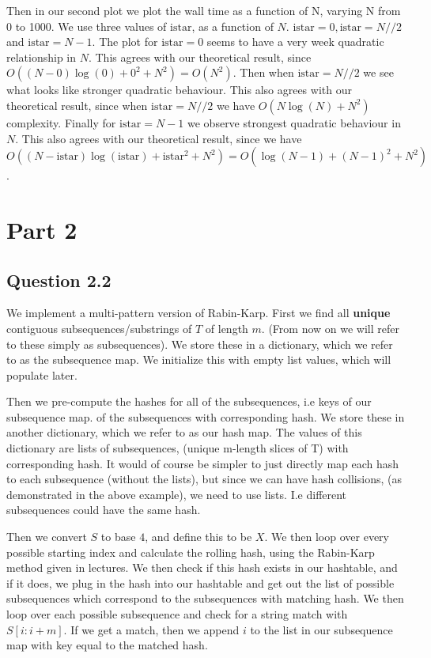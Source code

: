 \documentclass[a4paper, oneside]{book}
\begin{document}
Then in our second plot we plot the wall time as a function of N, varying N from 0 to 1000.
We use three values of $\text{istar}$, as a function of $N$. $\text{istar} = 0, \text{istar} = N // 2$ and $\text{istar} = N - 1$.
The plot for $\text{istar}=0$ seems to have a very week quadratic relationship in $N$.
This agrees with our theoretical result, since $O((N - 0)\log(0) + 0^2 + N^2) = O(N^2).$
Then when $\text{istar} = N // 2$ we see what looks like stronger quadratic behaviour.
This also agrees with our theoretical result, since when $\text{istar} = N//2$ we have $O(N\log(N) + N^2)$ complexity.
Finally for $\text{istar} = N -1$ we observe strongest quadratic behaviour in $N$. This also agrees with our theoretical
result, since we have $O((N - \text{istar})\log(\text{istar}) + \text{istar}^2 + N^2) = O(\log(N - 1) + (N - 1)^2 + N^2)$.

\section*{Part 2}

\subsection*{Question 2.2}
We implement a multi-pattern version of Rabin-Karp.
First we find all \textbf{unique} contiguous subsequences/substrings of $T$ of length $m$.
(From now on we will refer to these simply as subsequences).
We store these in a dictionary, which we refer to as the subsequence map.
We initialize this with empty list values, which will populate later.

Then we pre-compute the hashes for all of the subsequences, i.e keys of our subsequence map.
of the subsequences with corresponding hash. We store these in another dictionary, which we refer
to as our hash map. The values of this dictionary are lists of subsequences, (unique m-length slices of T)
with corresponding hash.
It would of course be simpler to just directly map each hash to each subsequence (without the lists),
but since we can have hash collisions, (as demonstrated in the above example), we need
to use lists. I.e different subsequences could have the same hash.

Then we convert $S$ to base $4$, and define this to be $X$. We then loop over every
possible starting index and calculate the rolling hash, using the Rabin-Karp method
given in lectures. We then check if this hash exists in our hashtable, and
if it does, we plug in the hash into our hashtable and get out the list of possible
subsequences which correspond to the subsequences with matching hash.
We then loop over each possible subsequence and check for a string match with $S[i:i+m]$.
If we get a match, then we append $i$ to the list in our subsequence map with key equal to the matched hash.
\end{document}

